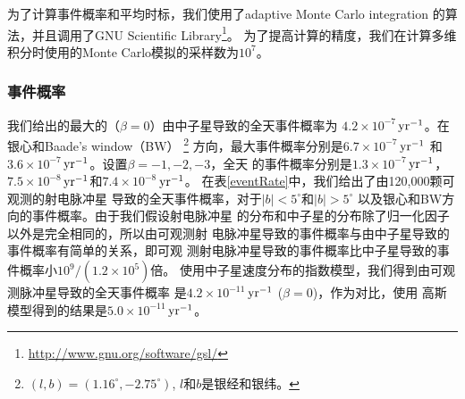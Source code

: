 为了计算事件概率和平均时标，我们使用了adaptive Monte Carlo integration
的算法，并且调用了GNU Scientific Library\footnote{\url{http://www.gnu.org/software/gsl/}}。
为了提高计算的精度，我们在计算多维积分时使用的Monte Carlo模拟的采样数为$10^7$。

\subsubsection{事件概率}

我们给出的最大的（$\beta = 0$）由中子星导致的全天事件概率为
$4.2\times10^{-7}$\,$\rm{yr^{-1}}$。在银心和Baade's window（BW）
\footnote{$(l,b)=(1.16^{\circ},-2.75^{\circ})$, $l$和$b$是银经和银纬。} 
方向，最大事件概率分别是$6.7\times10^{-7}$\,$\rm{yr^{-1}}$
和$3.6\times10^{-7}$\,$\rm{yr^{-1}}$。设置$\beta=-1,-2,-3$，全天
的事件概率分别是$1.3\times10^{-7}$\,$\rm{yr^{-1}}$，
$7.5\times10^{-8}$\,$\rm{yr^{-1}}$和$7.4\times10^{-8}$\,$\rm{yr^{-1}}$。
在表\ref{eventRate}中，我们给出了由120,000颗可观测的射电脉冲星
导致的全天事件概率，对于$\mid b\mid<5^{\circ}$和$\mid
b\mid>5^{\circ}$ 以及银心和BW方向的事件概率。由于我们假设射电脉冲星
的分布和中子星的分布除了归一化因子以外是完全相同的，所以由可观测射
电脉冲星导致的事件概率与由中子星导致的事件概率有简单的关系，即可观
测射电脉冲星导致的事件概率比中子星导致的事件概率小$10^9/\left(1.2\times10^5\right)$倍。
使用中子星速度分布的指数模型，我们得到由可观测脉冲星导致的全天事件概率
是$4.2\times10^{-11}$\,$\rm{yr^{-1}}$ ($\beta=0$)，作为对比，使用
高斯模型得到的结果是$5.0\times10^{-11}$\,$\rm{yr^{-1}}$。

